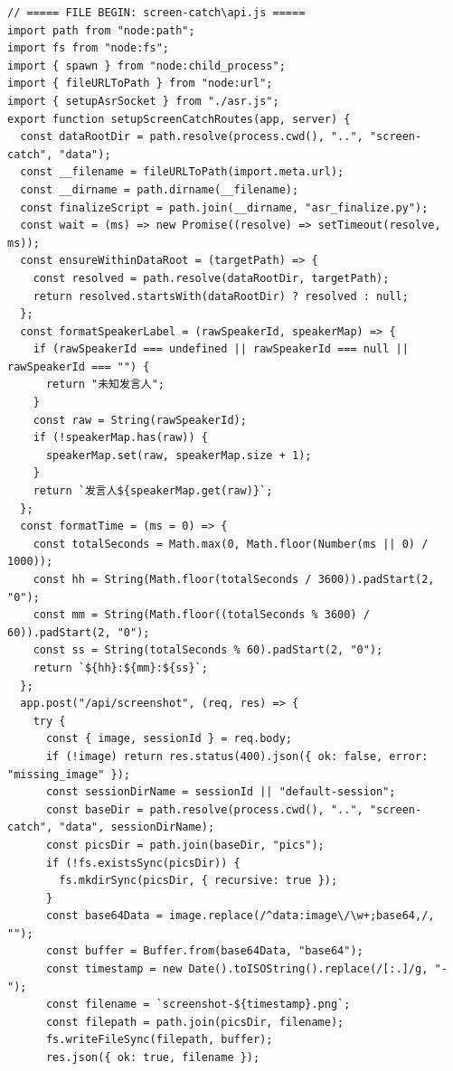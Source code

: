 \documentclass[12pt,a4paper]{article}
\begin{document}
\fancyhead[R]{}
\begin{Verbatim}[fontsize=\footnotesize]
// ===== FILE BEGIN: screen-catch\api.js =====
import path from "node:path";
import fs from "node:fs";
import { spawn } from "node:child_process";
import { fileURLToPath } from "node:url";
import { setupAsrSocket } from "./asr.js";
export function setupScreenCatchRoutes(app, server) {
  const dataRootDir = path.resolve(process.cwd(), "..", "screen-catch", "data");
  const __filename = fileURLToPath(import.meta.url);
  const __dirname = path.dirname(__filename);
  const finalizeScript = path.join(__dirname, "asr_finalize.py");
  const wait = (ms) => new Promise((resolve) => setTimeout(resolve, ms));
  const ensureWithinDataRoot = (targetPath) => {
    const resolved = path.resolve(dataRootDir, targetPath);
    return resolved.startsWith(dataRootDir) ? resolved : null;
  };
  const formatSpeakerLabel = (rawSpeakerId, speakerMap) => {
    if (rawSpeakerId === undefined || rawSpeakerId === null || rawSpeakerId === "") {
      return "未知发言人";
    }
    const raw = String(rawSpeakerId);
    if (!speakerMap.has(raw)) {
      speakerMap.set(raw, speakerMap.size + 1);
    }
    return `发言人${speakerMap.get(raw)}`;
  };
  const formatTime = (ms = 0) => {
    const totalSeconds = Math.max(0, Math.floor(Number(ms || 0) / 1000));
    const hh = String(Math.floor(totalSeconds / 3600)).padStart(2, "0");
    const mm = String(Math.floor((totalSeconds % 3600) / 60)).padStart(2, "0");
    const ss = String(totalSeconds % 60).padStart(2, "0");
    return `${hh}:${mm}:${ss}`;
  };
  app.post("/api/screenshot", (req, res) => {
    try {
      const { image, sessionId } = req.body;
      if (!image) return res.status(400).json({ ok: false, error: "missing_image" });
      const sessionDirName = sessionId || "default-session";
      const baseDir = path.resolve(process.cwd(), "..", "screen-catch", "data", sessionDirName);
      const picsDir = path.join(baseDir, "pics");
      if (!fs.existsSync(picsDir)) {
        fs.mkdirSync(picsDir, { recursive: true });
      }
      const base64Data = image.replace(/^data:image\/\w+;base64,/, "");
      const buffer = Buffer.from(base64Data, "base64");
      const timestamp = new Date().toISOString().replace(/[:.]/g, "-");
      const filename = `screenshot-${timestamp}.png`;
      const filepath = path.join(picsDir, filename);
      fs.writeFileSync(filepath, buffer);
      res.json({ ok: true, filename });
\end{Verbatim}
\newpage
\end{document}
